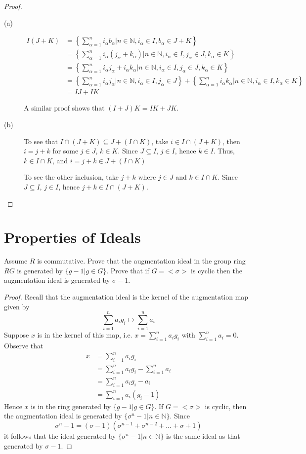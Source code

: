 \documentclass[12pt,leqno]{book}
\numberwithin{equation}{section}
\newcommand{\question}[2] {\vspace{.25in}\noindent\fbox{#1} #2 \vspace{.10in}}
\theoremstyle{definition}
\begin{document}
\begin{proof}\indent
 \begin{description}
  \item [(a)] \begin{align*}I(J+K)&=\left\{\sum_{\alpha=1}^ni_{\alpha}b_{\alpha}|n\in\mathbb{N},i_{\alpha}\in I,b_{\alpha}\in J+K\right\}\\&=\left\{\sum_{\alpha=1}^ni_{\alpha}(j_{\alpha}+k_{\alpha})|n\in\mathbb{N},i_{\alpha}\in I,j_{\alpha}\in J,k_{\alpha}\in K\right\}\\&=\left\{\sum_{\alpha=1}^ni_{\alpha}j_{\alpha}+i_{\alpha}k_{\alpha}|n\in\mathbb{N},i_{\alpha}\in I,j_{\alpha}\in J,k_{\alpha}\in K\right\}\\&=\left\{\sum_{\alpha=1}^ni_{\alpha}j_{\alpha}|n\in\mathbb{N},i_{\alpha}\in I,j_{\alpha}\in J\right\}+\left\{\sum_{\alpha=1}^ni_{\alpha}k_{\alpha}|n\in\mathbb{N},i_{\alpha}\in I,k_{\alpha}\in K\right\}\\&=IJ+IK\end{align*}

A similar proof shows that $(I+J)K=IK+JK$.
  \item [(b)] To see that $I\cap(J+K)\subseteq J+(I\cap K)$, take $i\in I\cap(J+K)$, then $i=j+k$ for some $j\in J$, $k\in K$. Since $J\subseteq I$, $j\in I$, hence $k\in I$. Thus, $k\in I\cap K$, and $i=j+k\in J+(I\cap K)$

To see the other inclusion, take $j+k$ where $j\in J$ and $k\in I\cap K$. Since $J\subseteq I$, $j\in I$, hence $j+k\in I\cap(J+K)$.\qedhere
 \end{description}

\end{proof}


\section{Properties of Ideals}

\question{2.}{Assume $R$ is commutative. Prove that the augmentation ideal in the group ring $RG$ is generated by $\{g-1|g\in G\}$. Prove that if $G=<\sigma>$ is cyclic then the augmentation ideal is generated by $\sigma-1$.}

\begin{proof}
 Recall that the augmentation ideal is the kernel of the augmentation map given by \[\sum_{i=1}^na_ig_i\mapsto\sum_{i=1}^na_i\] Suppose $x$ is in the kernel of this map, i.e. $x=\sum_{i=1}^na_ig_i$ with $\sum_{i=1}^na_i=0$. Observe that\begin{align*}x&=\sum_{i=1}^na_ig_i\\&=\sum_{i=1}^na_ig_i-\sum_{i=1}^na_i\\&=\sum_{i=1}^na_ig_i-a_i\\&=\sum_{i=1}^na_i(g_i-1)\end{align*} Hence $x$ is in the ring generated by $\{g-1|g\in G\}$. If $G=<\sigma>$ is cyclic, then the augmentation ideal is generated by $\{\sigma^n-1|n\in\mathbb{N}\}$. Since \[\sigma^n-1=(\sigma-1)(\sigma^{n-1}+\sigma^{n-2}+\hdots+\sigma+1)\] it follows that the ideal generated by $\{\sigma^n-1|n\in\mathbb{N}\}$ is the same ideal as that generated by $\sigma-1$.
\end{proof}
\end{document}
